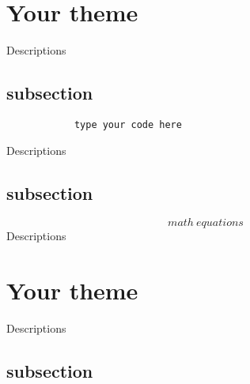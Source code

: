 \documentclass[12pt]{article}
\begin{document}
\rhead{\today}

    \section*{Your theme}
    Descriptions
        \subsection{subsection}
        \begin{lstlisting}
            type your code here
        \end{lstlisting}
            Descriptions

        \subsection{subsection}
        $$ 
        math\ equations
        $$
            Descriptions
    \section*{Your theme}
    Descriptions
        \subsection{subsection}
\end{document}
